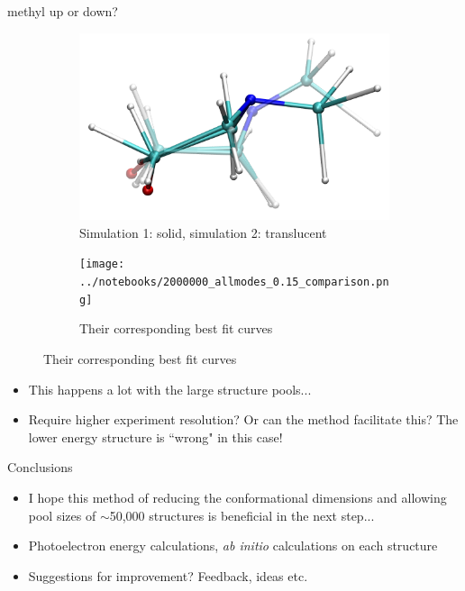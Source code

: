 \documentclass{beamer}
\begin{document}
\begin{frame}{methyl up or down?}
	\vspace{-5mm}
	\begin{figure}
		\centering
		\begin{subfigure}[b]{0.45\textwidth}
			\centering
			\includegraphics[width=\textwidth]{allmodes_1m_2m_frame10_comparison.png}
			\caption{Simulation 1: solid, simulation 2: translucent}
		\end{subfigure}
		\begin{subfigure}[b]{0.45\textwidth}
			\centering
			\texttt{[image: ../notebooks/2000000\_allmodes\_0.15\_comparison.png]}
			\caption{Their corresponding best fit curves}
		\end{subfigure}
	\end{figure}
	\begin{itemize}
		\item This happens a lot with the large structure pools...
		\item Require higher experiment resolution? Or can the method facilitate this? The lower energy structure is ``wrong" in this case!
	\end{itemize}
\end{frame}

\begin{frame}{Conclusions}
	\begin{itemize}
		\item I hope this method of reducing the conformational dimensions and allowing pool sizes of $\sim$50,000 structures is beneficial in the next step...
		\item Photoelectron energy calculations, \textit{ab initio} calculations on each structure
		\item Suggestions for improvement? Feedback, ideas etc.\
	\end{itemize}
\end{frame}
\end{document}
